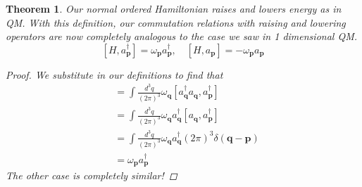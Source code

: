 \documentclass[11pt, oneside]{article}   	%
\theoremstyle{newline}
\theoremstyle{newline}
\newtheorem*{thm}{Theorem}
\theoremstyle{newline}
\theoremstyle{newline}
\theoremstyle{newline}
\newcommand{\ann}[1]{a_{ \mathbf{ #1 }}}
\newcommand{\crea}[1]{a^\dagger_{ \mathbf{ #1 }}}
\newcommand{\ve}[1]{ \mathbf{ #1 } }
\newcommand{\freq}[1]{\omega_\mathbf{ #1} }
\begin{document}
\begin{thm} 
Our normal ordered Hamiltonian raises and lowers energy as in QM. 
With this definition, our commutation relations with raising and lowering operators are now completely analogous to the case we saw in 1 dimensional QM. 
\[ 
[ H,  \crea{ p } ]  = \freq{p} \crea{ p }, \quad [ H, \ann{ p } ] = - \freq{p } \ann{ p } 
\] 
\begin{proof} 
We substitute in our definitions to find that 
\begin{align*} 
[ H, \crea{ p } ] &= \int \frac{ d^3 q }{ ( 2 \pi )^ 3 } \freq{ q} [ \crea{ q } \ann{q} , \crea{ p } ] \\
& =  \int \frac{ d^3 q }{ ( 2 \pi )^ 3 } \freq{q} \crea{q} [ \ann{ q}, \crea{ p} ] \\
&=   \int \frac{ d^3 q }{ ( 2 \pi )^ 3 } \freq{ q } \crea{ q} ( 2 \pi )^3  \delta ( \ve{ q - p } ) \\
&= \freq{ p } \crea{ p } 
\end{align*} 
The other case is completely similar!
\end{proof} 
\end{thm} 
\end{document}
